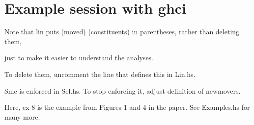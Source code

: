 \documentclass{article}
\begin{document}
\eject
\section*{Example session with ghci}
Note that lin puts (moved) (constituents) in parentheses, rather than deleting them,

just to make it easier to understand the analyses.

To delete them, uncomment the line that defines this in Lin.hs.

\noindent
Smc is enforced in Sel.hs. To stop enforcing it, adjust definition of newmovers.

\noindent
Here, ex 8 is the example from Figures 1 and 4 in the paper.
%
See Examples.hs for many more.

\inputminted[fontsize=\footnotesize]{haskell}{Examples-session.txt}
\end{document}

